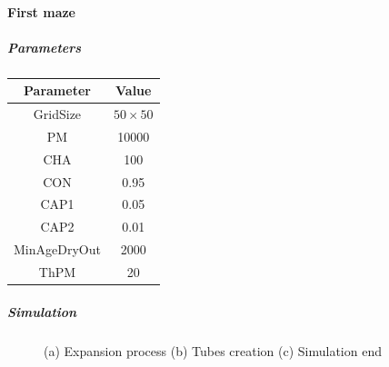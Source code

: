 \paragraph{First maze}

\subparagraph{Parameters}

\begin{center}
 \begin{tabular}{||c c||} 
 \hline
 Parameter & Value \\ [0.5ex] 
 \hline\hline
 GridSize & $50 \times 50$ \\ 
 \hline
 PM & 10000 \\ 
 \hline
 CHA & 100 \\ 
 \hline
 CON & 0.95 \\ 
 \hline
 CAP1 & 0.05 \\ 
 \hline
 CAP2 & 0.01 \\ 
 \hline
 MinAgeDryOut & 2000 \\
 \hline
 ThPM & 20 \\ [1ex] 
 \hline
 \end{tabular}
\end{center}

\subparagraph{Simulation}

\begin{figure}[H]
    \centering
    \caption{(a) Expansion process (b) Tubes creation (c) Simulation end}
    \label{fig:foobar}
\end{figure}


